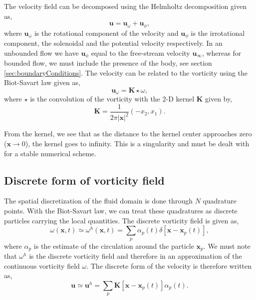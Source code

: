 The velocity field can be decomposed using the Helmholtz decomposition given as,
	\begin{equation}
	\mathbf{u} = \mathbf{u}_{\omega} + \mathbf{u}_{\phi},
	\label{eq:helmholtz}
	\end{equation}
where $\mathbf{u}_{\omega}$ is the rotational component of the velocity and $\mathbf{u}_{\phi}$ is the irrotational component, the solenoidal and the potential velocity respectively. In an unbounded flow we have $\mathbf{u}_{\phi}$ equal to the free-stream velocity $\mathbf{u}_{\infty}$, whereas for bounded flow, we must include the presence of the body, see section \ref{sec:boundaryConditions}. The velocity can be related to the vorticity using the Biot-Savart law given as,
	\begin{equation}
	\mathbf{u}_{\omega} = \mathbf{K}\star\omega,
	\end{equation}
where $\star$ is the convolution of the vorticity with the 2-D kernel $\mathbf{K}$ given by,
	\begin{equation}
	\mathbf{K} = \frac{1}{2\pi\left|\mathbf{x}\right|^2}\left(-x_2,x_1\right).
	\label{eq:GreensKernel}
	\end{equation}
	
From the kernel, we see that as the distance to the kernel center approaches zero ($\mathbf{x} \rightarrow 0$), the kernel goes to infinity. This is a singularity and must be dealt with for a stable numerical scheme. 	
	
\subsection{Discrete form of vorticity field}
The spatial discretization of the fluid domain is done through $N$ quadrature points. With the Biot-Savart law, we can treat these quadratures as discrete particles carrying the local quantities. The discrete vorticity field is given as,
	\begin{equation}
	\omega\left(\mathbf{x},t\right) \simeq \omega^h\left(\mathbf{x},t\right) = \sum_{p}\alpha_p\left(t\right)\delta \left[\mathbf{x}-\mathbf{x}_p\left(t\right)\right],
	\end{equation}
where $\alpha_{p}$ is the estimate of the circulation around the particle $\mathbf{x}_p$. We must note that $\omega^h$ is the discrete vorticity field and therefore in an approximation of the continuous vorticity field $\omega$. The discrete form of the velocity is therefore written as,
	\begin{equation}
	\mathbf{u} \simeq \mathbf{u}^h = \sum_p \mathbf{K}\left[\mathbf{x}-\mathbf{x}_p\left(t\right)\right]\alpha_p\left(t\right).
	\label{eq:discreteVelocity}
	\end{equation}
	
